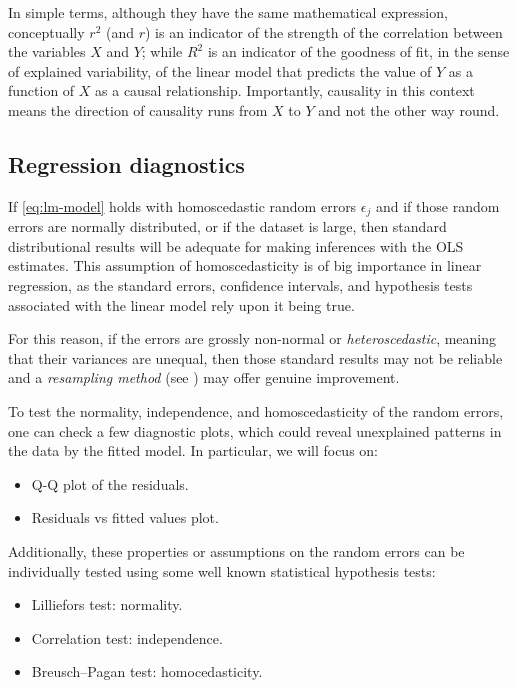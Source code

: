 \medskip
In simple terms, although they have the same mathematical expression, conceptually $r^{2}$ (and $r$) is an indicator of the strength of the correlation between the variables $X$ and $Y$; while $R^{2}$ is an indicator of the goodness of fit, in the sense of explained variability, of the linear model that predicts the value of $Y$ as a function of $X$ as a causal relationship. Importantly, causality in this context means the direction of causality runs from $X$ to $Y$ and not the other way round.

\vspace{0.7cm}
\subsection{Regression diagnostics}\label{sec:reg-analysis-issues}

If \eqref{eq:lm-model} holds with homoscedastic random errors $\epsilon_{j}$ and if those random errors are normally distributed, or if the dataset is large, then standard distributional results will be adequate for making inferences with the OLS estimates.
This assumption of homoscedasticity is of big importance in linear regression, as the standard errors, confidence intervals, and hypothesis tests associated with the linear model rely upon it being true.

For this reason, if the errors are grossly non-normal or \emph{heteroscedastic}, meaning that their variances are unequal, then those standard results may not be reliable and a \emph{resampling method} (see ) may offer genuine improvement.

\bigskip
To test the normality, independence, and homoscedasticity of the random errors, one can check a few diagnostic plots, which could reveal unexplained patterns in the data by the fitted model. In particular, we will focus on:
\begin{itemize}
	\item Q-Q plot of the residuals.
	\item Residuals vs fitted values plot.
\end{itemize}

\medskip
Additionally, these properties or assumptions on the random errors can be individually tested using some well known statistical hypothesis tests:
\begin{itemize}
	\item Lilliefors test: normality.
	\item Correlation test: independence.
	\item Breusch--Pagan test: homocedasticity.
\end{itemize}

